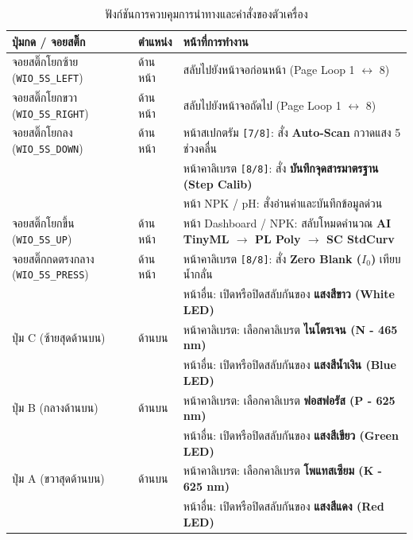 \begin{table}[H]
\centering
\caption{ฟังก์ชันการควบคุมการนำทางและคำสั่งของตัวเครื่อง}
\label{tab:controls_mapping}
\begin{tabularx}{\textwidth}{p{3.5cm}p{2.2cm}X}
\toprule
\textbf{ปุ่มกด / จอยสติ๊ก} & \textbf{ตำแหน่ง} & \textbf{หน้าที่การทำงาน} \\
\midrule
จอยสติ๊กโยกซ้าย (\texttt{WIO\_5S\_LEFT}) & ด้านหน้า & สลับไปยังหน้าจอก่อนหน้า (Page Loop 1 $\leftrightarrow$ 8) \\
จอยสติ๊กโยกขวา (\texttt{WIO\_5S\_RIGHT}) & ด้านหน้า & สลับไปยังหน้าจอถัดไป (Page Loop 1 $\leftrightarrow$ 8) \\
จอยสติ๊กโยกลง (\texttt{WIO\_5S\_DOWN}) & ด้านหน้า & หน้าสเปกตรัม \texttt{[7/8]}: สั่ง \textbf{Auto-Scan} กวาดแสง 5 ช่วงคลื่น \\
 & & หน้าคาลิเบรต \texttt{[8/8]}: สั่ง \textbf{บันทึกจุดสารมาตรฐาน (Step Calib)} \\
 & & หน้า NPK / pH: สั่งอ่านค่าและบันทึกข้อมูลด่วน \\
จอยสติ๊กโยกขึ้น (\texttt{WIO\_5S\_UP}) & ด้านหน้า & หน้า Dashboard / NPK: สลับโหมดคำนวณ \textbf{AI TinyML $\to$ PL Poly $\to$ SC StdCurv} \\
จอยสติ๊กกดตรงกลาง (\texttt{WIO\_5S\_PRESS}) & ด้านหน้า & หน้าคาลิเบรต \texttt{[8/8]}: สั่ง \textbf{Zero Blank ($I_0$)} เทียบน้ำกลั่น \\
 & & หน้าอื่น: เปิดหรือปิดสลับกันของ \textbf{แสงสีขาว (White LED)} \\
ปุ่ม C (ซ้ายสุดด้านบน) & ด้านบน & หน้าคาลิเบรต: เลือกคาลิเบรต \textbf{ไนโตรเจน (N - 465 nm)} \\
 & & หน้าอื่น: เปิดหรือปิดสลับกันของ \textbf{แสงสีน้ำเงิน (Blue LED)} \\
ปุ่ม B (กลางด้านบน) & ด้านบน & หน้าคาลิเบรต: เลือกคาลิเบรต \textbf{ฟอสฟอรัส (P - 625 nm)} \\
 & & หน้าอื่น: เปิดหรือปิดสลับกันของ \textbf{แสงสีเขียว (Green LED)} \\
ปุ่ม A (ขวาสุดด้านบน) & ด้านบน & หน้าคาลิเบรต: เลือกคาลิเบรต \textbf{โพแทสเซียม (K - 625 nm)} \\
 & & หน้าอื่น: เปิดหรือปิดสลับกันของ \textbf{แสงสีแดง (Red LED)} \\
\bottomrule
\end{tabularx}
\end{table}

